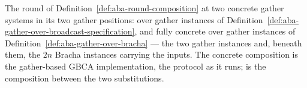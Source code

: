 \begin{definition}
  \label{def:aba-round-over-bracha}
  \leanok
  The round of Definition~\ref{def:aba-round-composition} at two concrete gather systems in its two gather positions: over gather instances of Definition~\ref{def:aba-gather-over-broadcast-specification}, and fully concrete over gather instances of Definition~\ref{def:aba-gather-over-bracha} --- the two gather instances and, beneath them, the $2n$ Bracha instances carrying the inputs.
  The concrete composition  is the gather-based GBCA implementation, the protocol as it runs;  is the composition between the two substitutions.
\end{definition}
